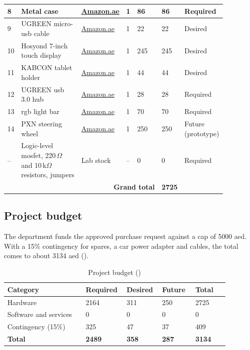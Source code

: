 \begin{table}[htbp]
\begin{tabular}{|p{0.040\linewidth}|p{0.300\linewidth}|p{0.120\linewidth}|p{0.050\linewidth}|p{0.120\linewidth}|p{0.100\linewidth}|p{0.150\linewidth}|}
8 & Metal case & \href{https://www.amazon.ae/dp/B0DGTMXWHT}{\textcolor{own1}{Amazon.ae}} & 1 & 86 & 86 & Required \\ \hline
9 & UGREEN micro-\gls{usb} cable & \href{https://www.amazon.ae/dp/B01NCJE1RE}{\textcolor{own1}{Amazon.ae}} & 1 & 22 & 22 & Desired \\ \hline
10 & Hosyond 7-inch touch display & \href{https://www.amazon.ae/dp/B09XKC53NH}{\textcolor{own1}{Amazon.ae}} & 1 & 245 & 245 & Desired \\ \hline
11 & KABCON tablet holder & \href{https://www.amazon.ae/dp/B092C6LZGS}{\textcolor{own1}{Amazon.ae}} & 1 & 44 & 44 & Desired \\ \hline
12 & UGREEN \gls{usb} 3.0 hub & \href{https://www.amazon.ae/dp/B0CD1BHXPZ}{\textcolor{own1}{Amazon.ae}} & 1 & 28 & 28 & Required \\ \hline
13 & \gls{rgb} light bar & \href{https://www.amazon.ae/dp/B0F93X6L1C}{\textcolor{own1}{Amazon.ae}} & 1 & 70 & 70 & Required \\ \hline
14 & PXN steering wheel & \href{https://www.amazon.ae/dp/B08BLMP4ZR}{\textcolor{own1}{Amazon.ae}} & 1 & 250 & 250 & Future (prototype) \\ \hline
-- & Logic-level \gls{mosfet}, 220\,$\Omega$ and 10\,k$\Omega$ resistors, jumpers & Lab stock & -- & 0 & 0 & Required \\ \hline
\multicolumn{5}{|r|}{\textbf{Grand total}} & \textbf{2725} & \\
\hline
\end{tabular}
\end{table}


\subsection{Project budget}

The department funds the approved purchase request against a cap of 5000 \gls{aed}. With a 15\% contingency for spares, a car power adapter and cables, the total comes to about 3134 \gls{aed} ().

\begin{table}[htbp]
\centering
\caption{Project budget ()}
\label{tab:ch5-10}
\footnotesize
\setlength{\tabcolsep}{3pt}
\renewcommand{\arraystretch}{1.15}
\begin{tabular}{|p{0.330\linewidth}|p{0.140\linewidth}|p{0.140\linewidth}|p{0.140\linewidth}|p{0.140\linewidth}|}
\hline
\textbf{Category} & \textbf{Required} & \textbf{Desired} & \textbf{Future} & \textbf{Total} \\
\hline
Hardware & 2164 & 311 & 250 & 2725 \\
\hline
Software and services & 0 & 0 & 0 & 0 \\
\hline
Contingency (15\%) & 325 & 47 & 37 & 409 \\
\hline
\textbf{Total} & \textbf{2489} & \textbf{358} & \textbf{287} & \textbf{3134} \\
\hline
\end{tabular}
\end{table}

